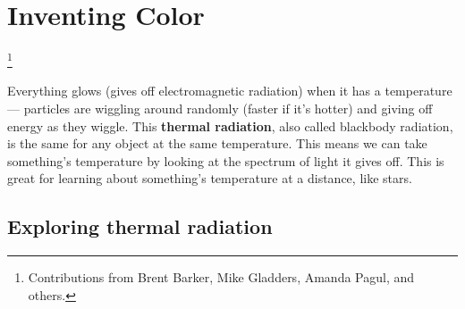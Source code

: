 \chapter{Inventing Color}\footnote{Contributions from Brent Barker, Mike Gladders, Amanda Pagul, and others.}




Everything glows (gives off electromagnetic radiation) when it has a temperature --- particles are wiggling around randomly (faster if it's hotter) and giving off energy as they wiggle. This \textbf{thermal radiation}, also called blackbody radiation, is the same for any object at the same temperature. This means we can take something's temperature by looking at the spectrum of light it gives off. This is great for learning about something's temperature at a distance, like stars.


\section{Exploring thermal radiation}\label{ic:sec:exploring}

